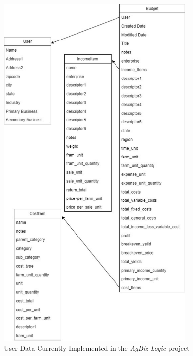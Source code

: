 \documentclass[onecolumn, draftclsnofoot,10pt, compsoc]{article}
\begin{document}
		\begin{figure}[htb]
			\begin{center}
				\includegraphics[width=275pt]{UMLDiagrams/UserData.eps}
			\end{center}
			\caption{User Data Currently Implemented in the \textit{AgBiz Logic} project}
			\label{fig:UD1}
		\end{figure}
		\clearpage
\end{document}
